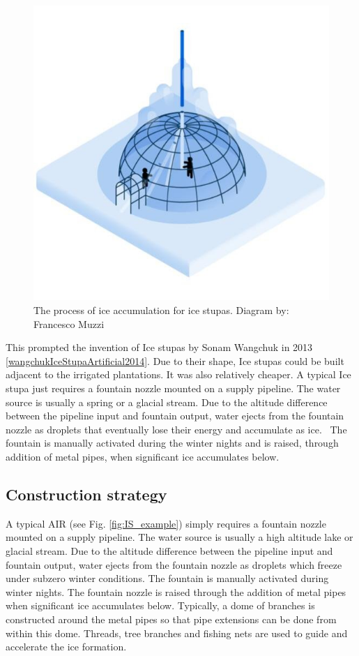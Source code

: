 \begin{figure}[t]
\centering
\includegraphics[width=12cm]{Figures/IS_science.jpg}

\caption{ The process of ice accumulation for ice stupas. Diagram by: Francesco Muzzi }

\label{fig:ISscience}
\end{figure}

This prompted the invention of Ice stupas by Sonam Wangchuk in 2013 \ref{wangchukIceStupaArtificial2014}. Due to
their shape, Ice stupas could be built adjacent to the irrigated plantations. It was also relatively cheaper. A
typical Ice stupa just requires a fountain nozzle mounted on a supply pipeline. The water source is usually a
spring or a glacial stream. Due to the altitude difference between the pipeline input and fountain output, water
ejects from the fountain nozzle as droplets that eventually lose their energy and accumulate as ice.  The
fountain is manually activated during the winter nights and is raised, through addition of metal pipes, when
significant ice accumulates below.

\subsection{Construction strategy}

A typical AIR (see Fig. \ref{fig:IS_example}) simply requires a fountain nozzle mounted on a supply pipeline.
The water source is usually a high altitude lake or glacial stream. Due to the altitude difference between the
pipeline input and fountain output, water ejects from the fountain nozzle as droplets which freeze under subzero
winter conditions. The fountain is manually activated during winter nights. The fountain nozzle is raised
through the addition of metal pipes when significant ice accumulates below.  Typically, a dome of branches is
constructed around the metal pipes so that pipe extensions can be done from within this dome. Threads, tree
branches and fishing nets are used to guide and accelerate the ice formation.

